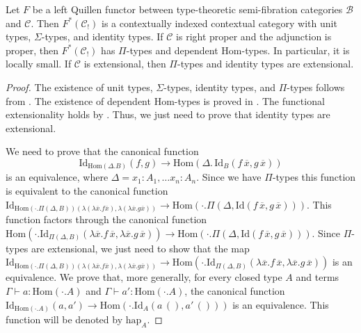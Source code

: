 \documentclass[reqno]{amsart}
\theoremstyle{definition}
\theoremstyle{remark}
\newcommand{\fs}[1]{\mathrm{#1}}
\newcommand{\scat}[1]{\mathcal{#1}}
\newcommand{\Hom}{\fs{Hom}}
\newcommand{\Id}{\fs{Id}}
\numberwithin{figure}{section}
\begin{document}
\begin{prop}
Let $F$ be a left Quillen functor between type-theoretic semi-fibration categories $\scat{B}$ and $\scat{C}$.
Then $F^*(\scat{C}_!)$ is a contextually indexed contextual category with unit types, $\Sigma$-types, and identity types.
If $\scat{C}$ is right proper and the adjunction is proper, then $F^*(\scat{C}_!)$ has $\Pi$-types and dependent $\Hom$-types.
In particular, it is locally small.
If $\scat{C}$ is extensional, then $\Pi$-types and identity types are extensional.
\end{prop}
\begin{proof}
The existence of unit types, $\Sigma$-types, identity types, and $\Pi$-types follows from \cite{local-universes}.
The existence of dependent $\Hom$-types is proved in .
The functional extensionality holds by \cite[Lemma~5.9]{shul-inv}.
Thus, we just need to prove that identity types are extensional.

We need to prove that the canonical function
\[ \Id_{\Hom(\Delta.B)}(f,g) \to \Hom(\Delta.\,\Id_B(f\,\overline{x},g\,\overline{x})) \] is an equivalence, where $\Delta = x_1 : A_1, \ldots x_n : A_n$.
Since we have $\Pi$-types this function is equivalent to the canonical function $\Id_{\Hom(\cdot . \Pi(\Delta,B))(\lambda(\lambda \overline{x}.f\overline{x}),\lambda(\lambda \overline {x}.g\overline{x}))} \to \Hom(\cdot . \Pi(\Delta, \Id(f\,\overline{x},g\,\overline{x})))$.
This function factors through the canonical function $\Hom(\cdot . \Id_{\Pi(\Delta,B)}(\lambda \overline{x}. f\,\overline{x}, \lambda \overline{x}. g\,\overline{x})) \to \Hom(\cdot . \Pi(\Delta, \Id(f\,\overline{x},g\,\overline{x})))$.
Since $\Pi$-types are extensional, we just need to show that the map $\Id_{\Hom(\cdot . \Pi(\Delta,B))(\lambda(\lambda \overline{x}.f\overline{x}),\lambda(\lambda \overline {x}.g\overline{x}))} \to \Hom(\cdot . \Id_{\Pi(\Delta,B)}(\lambda \overline{x}. f\,\overline{x}, \lambda \overline{x}. g\,\overline{x}))$ is an equivalence.
We prove that, more generally, for every closed type $A$ and terms $\Gamma \vdash a : \Hom(\cdot.A)$ and $\Gamma \vdash a' : \Hom(\cdot.A)$, the canonical function $\Id_{\Hom(\cdot . A)}(a,a') \to \Hom(\cdot . \Id_A(a\,(),a'\,()))$ is an equivalence.
This function will be denoted by $\fs{hap}_A$.


\end{proof}
\end{document}
